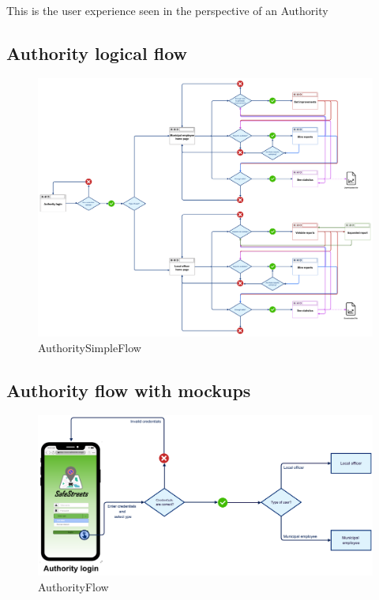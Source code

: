 			\paragraph{}
				This is the user experience seen in the perspective of an Authority
			\subsection{Authority logical flow}
			\begin{figure}[!h]
				\centering
				\includegraphics[width=\textwidth]{images/Flow/AuthoritySimpleFlow}
				\caption{AuthoritySimpleFlow}
			\end{figure}
			\subsection{Authority flow with mockups}
			\begin{figure}[!h]
				\centering
				\includegraphics[width=\textwidth]{images/Flow/AuthorityFlow}
				\caption{AuthorityFlow}
			\end{figure}
			\clearpage
